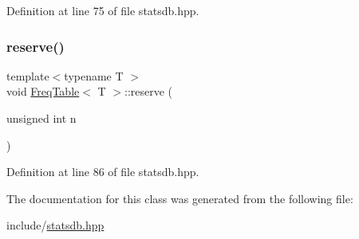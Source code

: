 Definition at line 75 of file statsdb.\+hpp.

\mbox{\label{class_freq_table_a0bdced25f7c0bee38e073c4654578d19}} 
\subsubsection{\texorpdfstring{reserve()}{reserve()}}
{\footnotesize\ttfamily template$<$typename T $>$ \\
void \hyperlink{class_freq_table}{Freq\+Table}$<$ T $>$\+::reserve (\begin{DoxyParamCaption}\item[{unsigned int}]{n }\end{DoxyParamCaption})\hspace{0.3cm}{\ttfamily [inline]}}



Definition at line 86 of file statsdb.\+hpp.



The documentation for this class was generated from the following file\+:\begin{DoxyCompactItemize}
\item 
include/\hyperlink{statsdb_8hpp}{statsdb.\+hpp}\end{DoxyCompactItemize}
